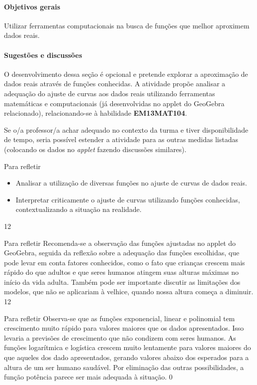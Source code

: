 \clearpage
\begin{texto}
{
\paragraph{Objetivos gerais}
Utilizar ferramentas computacionais na busca de funções que melhor aproximem dados reais.

\paragraph{Sugestões e discussões}
O desenvolvimento dessa seção é opcional e pretende explorar a aproximação de dados reais através de funções conhecidas. A atividade propõe analisar a adequação do ajuste de curvas aos dados reais utilizando ferramentas matemáticas e computacionais (já desenvolvidas no applet do GeoGebra relacionado), relacionando-se à habilidade \textbf{EM13MAT104}.

Se o/a professor/a achar adequado no contexto da turma e tiver disponibilidade de tempo, seria possível estender a atividade para as outras medidas listadas (colocando os dados no \textit{applet} fazendo discussões similares).
}
\end{texto}
\clearmargin
\begin{objectives}{Para refletir}
{
	\begin{itemize}
	\item Analisar a utilização de diversas funções no ajuste de curvas de dados reais.
	\item Interpretar criticamente o ajuste de curvas utilizando funções conhecidas, contextualizando a situação na realidade.
	\end{itemize}
}{1}{2}
\end{objectives}
\begin{sugestions}{Para refletir}
{
	Recomenda-se a observação das funções ajustadas no applet do GeoGebra, seguida da reflexão sobre a adequação das funções escolhidas, que pode levar em conta fatores conhecidos, como o fato que crianças crescem mais rápido do que adultos e que seres humanos atingem suas alturas máximas no início da vida adulta. Também pode ser importante discutir as limitações dos modelos, que não se aplicariam à velhice, quando nossa altura começa a diminuir.
}{1}{2}
\end{sugestions}

\begin{answer}{Para refletir}
{
	Observa-se que as funções exponencial, linear e polinomial tem crescimento muito rápido para valores maiores que os dados apresentados. Isso levaria a previsões de crescimento que não condizem com seres humanos. As funções logarítmica e logística crescem muito lentamente para valores maiores do que aqueles dos dado apresentados, gerando valores abaixo dos esperados para a altura de um ser humano saudável. Por eliminação das outras possibilidades, a função potência parece ser mais adequada à situação.
}{0}
\end{answer}

